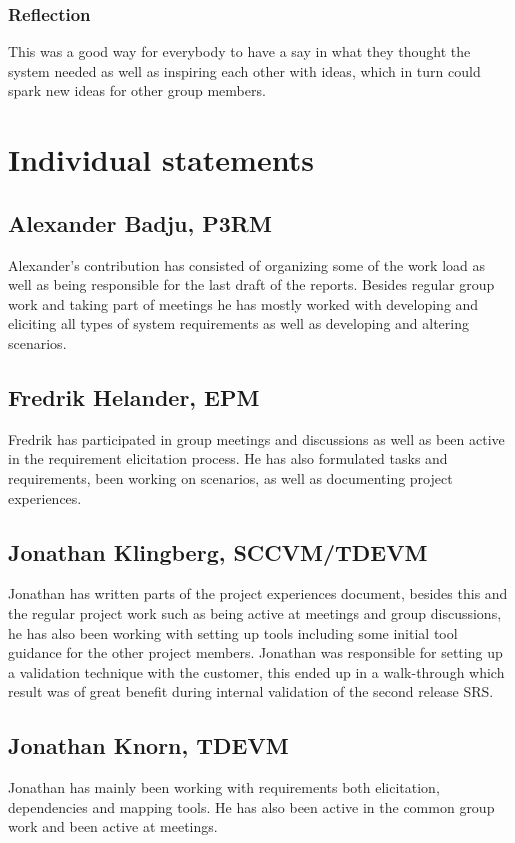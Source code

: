 \documentclass[10pt]{article}
\begin{document}
\subsubsection{Reflection}
This was a good way for everybody to have a say in what they thought the system needed as well as inspiring each other with ideas, which in turn could spark new ideas for other group members.


\section{Individual statements}
\noindent
\subsection{Alexander Badju, P3RM}
Alexander's contribution has consisted of organizing some of the work load as well as being responsible for the last draft of the reports. Besides regular group work and taking part of meetings he has mostly worked with developing and eliciting all types of system requirements as well as developing and altering scenarios. 
\subsection{Fredrik Helander, EPM}
Fredrik has participated in group meetings and discussions as well as been active in the requirement elicitation process. He has also formulated tasks and requirements, been working on scenarios, as well as documenting project experiences.
\subsection{Jonathan Klingberg, SCCVM/TDEVM}
Jonathan has written parts of the project experiences document, besides this and the regular project work such as being active at meetings and group discussions, he has also been working with setting up tools including some initial tool guidance for the other project members.
Jonathan was responsible for setting up a validation technique with the customer, this ended up in a walk-through which result was of great benefit during internal validation of the second release SRS.
\subsection{Jonathan Knorn, TDEVM}
Jonathan has mainly been working with requirements both elicitation, dependencies and mapping tools. 
He has also been active in the common group work and been active at meetings.
\end{document}
